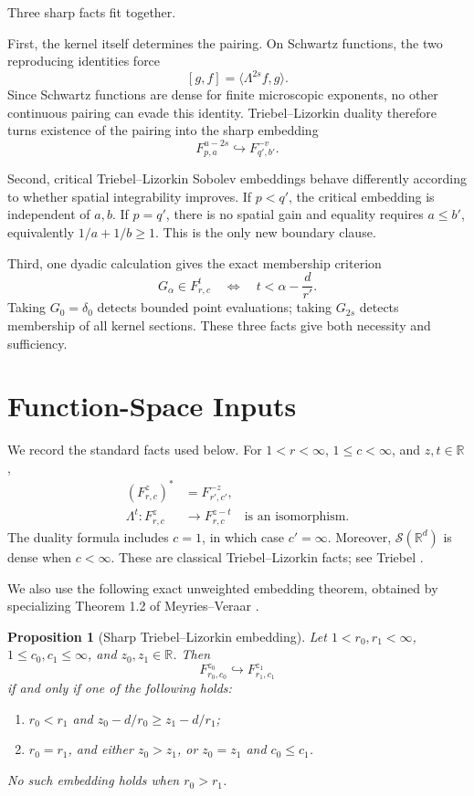 \documentclass[11pt]{article}
\newtheorem{proposition}{Proposition}
\newcommand{\R}{\mathbb R}
\newcommand{\Sch}{\mathcal S}
\newcommand{\Fsp}[3]{F^{#1}_{#2,#3}}
\newcommand{\Lambdaop}{\Lambda}
\newcommand{\ip}[2]{\langle #1,#2\rangle}
\begin{document}
Three sharp facts fit together.

First, the kernel itself determines the pairing.  On Schwartz functions,
the two reproducing identities force
\[
  [g,f]=\ip{\Lambdaop^{2s}f}{g}.
\]
Since Schwartz functions are dense for finite microscopic exponents, no
other continuous pairing can evade this identity.  Triebel--Lizorkin
duality therefore turns existence of the pairing into the sharp embedding
\[
  \Fsp{u-2s}{p}{a}\hookrightarrow \Fsp{-v}{q'}{b'}.
\]

Second, critical Triebel--Lizorkin Sobolev embeddings behave differently
according to whether spatial integrability improves.  If $p<q'$, the
critical embedding is independent of $a,b$.  If $p=q'$, there is no
spatial gain and equality requires $a\leq b'$, equivalently
$1/a+1/b\geq1$.  This is the only new boundary clause.

Third, one dyadic calculation gives the exact membership criterion
\[
  G_\alpha\in \Fsp{t}{r}{c}
  \quad\Longleftrightarrow\quad
  t<\alpha-\frac d{r'}.
\]
Taking $G_0=\delta_0$ detects bounded point evaluations; taking
$G_{2s}$ detects membership of all kernel sections.  These three facts
give both necessity and sufficiency.

\section*{Function-Space Inputs}

We record the standard facts used below.  For
$1<r<\infty$, $1\leq c<\infty$, and $z,t\in\R$,
\begin{align}
  (\Fsp{z}{r}{c})^*&=\Fsp{-z}{r'}{c'},
  \label{eq:dual}\tag{D}\\
  \Lambdaop^t:\Fsp{z}{r}{c}&\longrightarrow
  \Fsp{z-t}{r}{c}
  \quad\text{is an isomorphism}.
  \label{eq:lift}\tag{L}
\end{align}
The duality formula includes $c=1$, in which case $c'=\infty$.
Moreover, $\Sch(\R^d)$ is dense when $c<\infty$.  These are classical
Triebel--Lizorkin facts; see Triebel \cite[Sections 2.3 and 2.11]{Triebel}.

We also use the following exact unweighted embedding theorem, obtained by
specializing Theorem 1.2 of Meyries--Veraar \cite{MeyriesVeraar}.

\begin{proposition}[Sharp Triebel--Lizorkin embedding]
\label{prop:embedding}
Let $1<r_0,r_1<\infty$, $1\leq c_0,c_1\leq\infty$, and
$z_0,z_1\in\R$.  Then
\[
  \Fsp{z_0}{r_0}{c_0}\hookrightarrow
  \Fsp{z_1}{r_1}{c_1}
\]
if and only if one of the following holds:
\begin{enumerate}
  \item $r_0<r_1$ and
  $z_0-d/r_0\geq z_1-d/r_1$;
  \item $r_0=r_1$, and either $z_0>z_1$, or
  $z_0=z_1$ and $c_0\leq c_1$.
\end{enumerate}
No such embedding holds when $r_0>r_1$.
\end{proposition}
\end{document}

